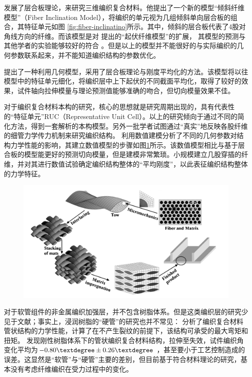 \citeauthor{yang_fiber_1986}\cite{yang_fiber_1986}发展了层合板理论，来研究三维编织复合材料。他提出了一个新的模型“倾斜纤维模型”（Fiber Inclination Model），将编织的单元视为几组倾斜单向层合板的组合，其特征单元如图		\ref{fig:fiber-inclinatino}所示。其中，倾斜的层合板代表了4股对角线方向的纤维。而该模型是对
\citeauthor{chou_one-dimensional_1983}提出的“起伏纤维模型”\cite{chou_one-dimensional_1983}的扩展，
其模型的预测与其他学者的实验能够较好的符合
\cite{florentine_magnaweave_1984,macander_fabrication_1986,gause_mechanical_1983}。但是以上的模型并不能很好的与实际编织的几何参数联系起来，并不能知道编织结构的参数优化。

\citeauthor{byun_analytical_1991}\cite{byun_analytical_1991}提出了一种利用几何模型，采用了层合板理论与刚度平均化的方法。该模型将以往模型中的特征单元细化，将编织层中上下起伏的不同截面平均化，取得了较好的效果，试件轴向拉伸模量与理论预测值能够准确的吻合，但切向模量效果不佳。


对于编织复合材料本构的研究，核心的思想就是研究周期出现的，具有代表性的“特征单元”RUC（Representative Unit Cell）。以上的研究倾向于通过不同的简化方法，得到一套解析的本构模型。另外一批学者试图通过“真实”地反映各股纤维的细管力学传力机制来研究编织结构。
\citeauthor{Goyal2005}\cite{Goyal2005}利用数值建模分析了不同的几何参数对结构力学性能的影响，其建立数值模型的步骤如图\ref{fig:Goyal}所示。该数值模型相比\citeauthor{byun_analytical_1991}与\citeauthor{chou_one-dimensional_1983}基于层合板的模型能更好的预测切向模量，但是建模非常繁琐。\citeauthor{Cho2013}\cite{Cho2013}小规模建立几股穿插的纤维，并对其进行数值试验确定编织结构整体的“平均刚度”，以此表征编织结构整体的力学特征。

\begin{figure}
\centering
\includegraphics[height=0.25\textheight]{figure/chap1/Goyal}
\label{fig:Goyal}
\end{figure}
对于软管组件的非金属编织加强层，并不包含树脂体系。但是这类编织层的研究少见于文献；事实上，浸润树脂的“硬管”的研究也并不常见：
\citeauthor{Nakai1995}\cite{Nakai1995}分析了编织复合材料管状结构的力学性能，计算了在不产生裂纹的前提下，该结构可承受的最大弯矩和扭矩。
\citeauthor{Leung2013}\cite{Leung2013}发现刚性树脂体系下的管状编织复合材料结构，拉伸至失效，试件编织角变化平均为$ -0.80\textdegree \pm 0.26 \textdegree $ ，甚至要小于工艺控制造成的误差。这显然是“软管”与“硬管”主要的差别，但目前基于符合材料理论的研究，基本没有考虑纤维编织在受力过程中的变化。

